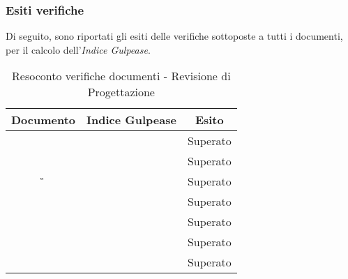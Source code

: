 	\subsubsection{Esiti verifiche}
	Di seguito, sono riportati gli esiti delle verifiche sottoposte a tutti i documenti, per il calcolo dell’\textit{Indice Gulpease}.
	
	\begin{table}[H]
		\begin{center}
			\begin{tabular}{|c|c|c|}
				\hline
				\textbf{Documento}&	{\textbf{Indice Gulpease}} & \textbf{Esito} \\
				\hline
				\textit{\ST}		&		&	Superato	\\
				\hline
				\textit{\AdR}		&		&	Superato	\\
				\hline
				\textit{\G}			&		&	Superato	\\
				\hline
				\textit{\NdP}		&		&	Superato	\\
				\hline
				\textit{\PdP} 		&		&	Superato 	\\
				\hline
				\textit{\PdQ} 		&		&	Superato	\\
				\hline
				\textit{\SdF}		& 		&	Superato	\\
				\hline
			\end{tabular}
		\end{center}
		\caption{Resoconto verifiche documenti - Revisione di Progettazione}
	\end{table}